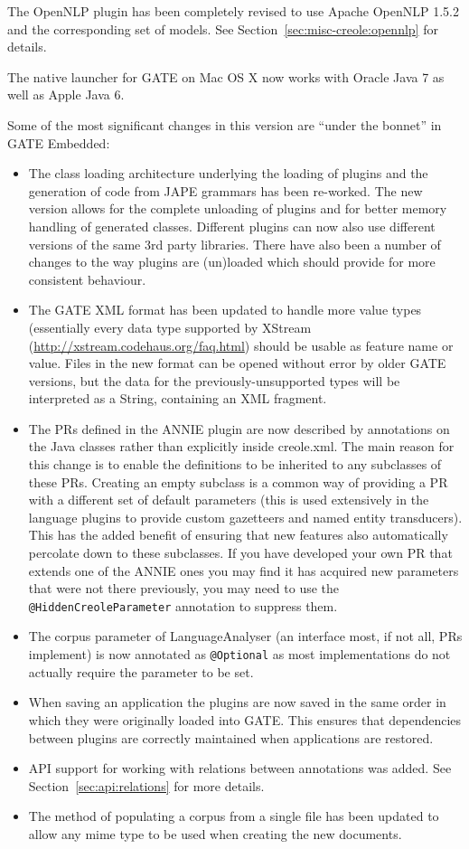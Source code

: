 The OpenNLP plugin has been completely revised to use Apache OpenNLP 1.5.2 and
the corresponding set of models.  See Section~\ref{sec:misc-creole:opennlp} for
details.

The native launcher for GATE on Mac OS X now works with Oracle Java 7 as well
as Apple Java 6.


Some of the most significant changes in this version are ``under the bonnet''
in GATE Embedded:
\begin{itemize}
\item The class loading architecture underlying the loading of plugins and the
  generation of code from JAPE grammars has been re-worked. The new version
  allows for the complete unloading of plugins and for better memory handling of
  generated classes. Different plugins can now also use different versions of the
  same 3rd party libraries. There have also been a number of changes to the way
  plugins are (un)loaded which should provide for more consistent behaviour.
\item The GATE XML format has been updated to handle more value types
  (essentially every data type supported by XStream
  (\url{http://xstream.codehaus.org/faq.html}) should be usable as feature name
  or value. Files in the new format can be opened without error by older GATE
  versions, but the data for the previously-unsupported types will be
  interpreted as a String, containing an XML fragment.
\item The PRs defined in the ANNIE plugin are now described by annotations on
  the Java classes rather than explicitly inside creole.xml. The main reason for
  this change is to enable the definitions to be inherited to any subclasses of
  these PRs. Creating an empty subclass is a common way of providing a PR with a
  different set of default parameters (this is used extensively in the language
  plugins to provide custom gazetteers and named entity transducers). This has
  the added benefit of ensuring that new features also automatically percolate
  down to these subclasses.  If you have developed your own PR that extends one
  of the ANNIE ones you may find it has acquired new parameters that were not
  there previously, you may need to use the \verb!@HiddenCreoleParameter!
  annotation to suppress them.
\item The corpus parameter of LanguageAnalyser (an interface most, if not all,
  PRs implement) is now annotated as \verb|@Optional| as most implementations
  do not actually require the parameter to be set.
\item When saving an application the plugins are now saved in the same order in
  which they were originally loaded into GATE. This ensures that dependencies
  between plugins are correctly maintained when applications are restored.
\item API support for working with relations between annotations was added. See
  Section~\ref{sec:api:relations} for more details.
\item The method of populating a corpus from a single file has been updated to
  allow any mime type to be used when creating the new documents.
\end{itemize}

